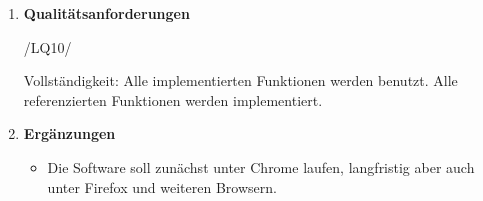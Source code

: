\begin{enumerate}
                                                                                                                                                                                                                                                    
\item \textbf{Qualitätsanforderungen}

\hypertarget{/LQ10/}{/LQ10/} Vollständigkeit: Alle implementierten Funktionen werden benutzt. Alle referenzierten Funktionen werden implementiert.

\item \textbf{Ergänzungen}
\begin{itemize}
\item  Die Software soll zunächst unter \hypertarget{Chrome}{Chrome} laufen, langfristig aber auch unter Firefox und weiteren Browsern. 
\end{itemize}

\end{enumerate} 

